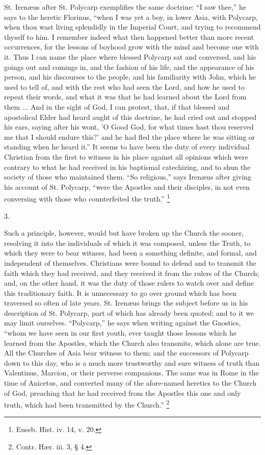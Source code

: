 St. Irenæus after St. Polycarp exemplifies the same doctrine:
``I saw thee,'' he says to the heretic Florinus, ``when I
was yet a boy, in lower Asia, with Polycarp, when thou wast living
splendidly in the Imperial Court, and trying to recommend thyself to
him. I remember indeed what then happened better than more recent
occurrences, for the lessons of boyhood grow with the mind and become
one with it. Thus I can name the place where blessed Polycarp sat and
conversed, and his goings out and comings in, and the fashion of his
life, and the appearance of his person, and his discourses to the
people, and his familiarity with John, which he used to tell of, and
with the rest who had seen the Lord, and how he used to repeat their
words, and what it was that he had learned about the Lord from them
... And in the sight of God, I can protest, that, if that blessed and
apostolical Elder had heard aught of this doctrine, he had cried out
and stopped his ears, saying after his wont, 'O Good God, for what
times hast thou reserved me that I should endure this?' and he had
fled the place where he was sitting or standing when he heard
it.'' It seems to have been the duty of every individual Christian
from the first to witness in his place against all opinions which were
contrary to what he had received in his baptismal catechizing, and to
shun the society of those who maintained them. ``So
religious,'' says Irenæus after giving his account of St.
Polycarp, ``were the Apostles and their disciples, in not even
conversing with those who counterfeited the truth.'' \footnote{Euseb. Hist. iv. 14, v. 20.}

3.

Such a principle, however, would but have broken up the Church the
sooner, resolving it into the individuals of which it was composed,
unless the Truth, to which they were to bear witness, had been a
something definite, and formal, and independent of themselves.
Christians were bound to defend and to transmit the faith which they
had received, and they received it from the rulers of the Church; and,
on the other hand, it was the duty of those rulers to watch over and
define this traditionary faith. It is unnecessary to go over ground
which has been traversed so often of late years. St. Irenæus brings
the subject before us in his description of St. Polycarp, part of
which has already been quoted; and to it we may limit ourselves.
``Polycarp,'' he says when writing against the Gnostics,
``whom we have seen in our first youth, ever taught those lessons
which he learned from the Apostles, which the Church also transmits,
which alone are true. All the Churches of Asia bear witness to them;
and the successors of Polycarp down to this day, who is a much more
trustworthy and sure witness of truth than Valentinus, Marcion, or
their perverse companions. The same was in Rome in the time of
Anicetus, and converted many of the afore-named heretics to the Church
of God, preaching that he had received from the Apostles this one and
only truth, which had been transmitted by the Church.'' \footnote{Contr. Hær. iii. 3, § 4.}

